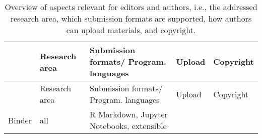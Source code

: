 \documentclass[onecolumn]{article}
\begin{document}
\begin{longtable}[]{@{}lllll@{}}
\caption{Overview of aspects relevant for editors and authors, i.e., the
addressed research area, which submission formats are supported, how
authors can upload materials, and copyright.}\tabularnewline
\toprule
\begin{minipage}[b]{0.11\columnwidth}\raggedright
\strut
\end{minipage} & \begin{minipage}[b]{0.11\columnwidth}\raggedright
Research area\strut
\end{minipage} & \begin{minipage}[b]{0.21\columnwidth}\raggedright
Submission formats/ Program. languages\strut
\end{minipage} & \begin{minipage}[b]{0.21\columnwidth}\raggedright
Upload\strut
\end{minipage} & \begin{minipage}[b]{0.21\columnwidth}\raggedright
Copyright\strut
\end{minipage}\tabularnewline
\midrule
\endfirsthead
\toprule
\begin{minipage}[b]{0.11\columnwidth}\raggedright
\strut
\end{minipage} & \begin{minipage}[b]{0.11\columnwidth}\raggedright
Research area\strut
\end{minipage} & \begin{minipage}[b]{0.21\columnwidth}\raggedright
Submission formats/ Program. languages\strut
\end{minipage} & \begin{minipage}[b]{0.21\columnwidth}\raggedright
Upload\strut
\end{minipage} & \begin{minipage}[b]{0.21\columnwidth}\raggedright
Copyright\strut
\end{minipage}\tabularnewline
\midrule
\endhead
\begin{minipage}[t]{0.11\columnwidth}\raggedright
Binder\strut
\end{minipage} & \begin{minipage}[t]{0.11\columnwidth}\raggedright
all\strut
\end{minipage} & \begin{minipage}[t]{0.21\columnwidth}\raggedright
R Markdown, Jupyter Notebooks, extensible\strut
\end{minipage} & \begin{minipage}[t]{0.21\columnwidth}\raggedright

\end{minipage}
\end{longtable}
\end{document}
